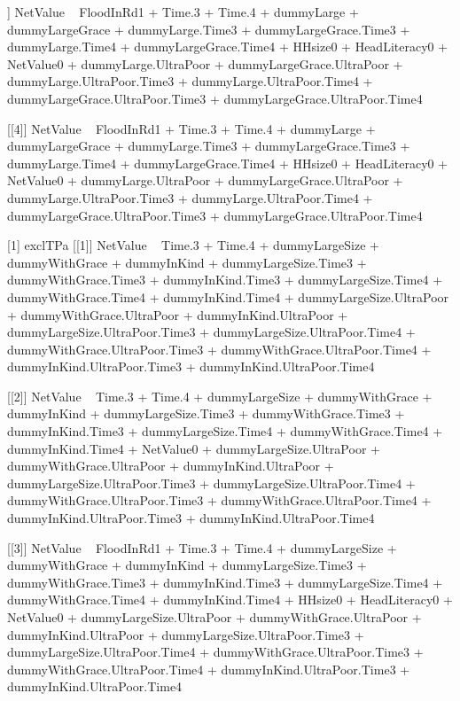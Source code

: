 \begin{Schunk}
\begin{Soutput}
[[3]]
NetValue ~ FloodInRd1 + Time.3 + Time.4 + dummyLarge + dummyLargeGrace + 
    dummyLarge.Time3 + dummyLargeGrace.Time3 + dummyLarge.Time4 + 
    dummyLargeGrace.Time4 + HHsize0 + HeadLiteracy0 + NetValue0 + 
    dummyLarge.UltraPoor + dummyLargeGrace.UltraPoor + dummyLarge.UltraPoor.Time3 + 
    dummyLarge.UltraPoor.Time4 + dummyLargeGrace.UltraPoor.Time3 + 
    dummyLargeGrace.UltraPoor.Time4

[[4]]
NetValue ~ FloodInRd1 + Time.3 + Time.4 + dummyLarge + dummyLargeGrace + 
    dummyLarge.Time3 + dummyLargeGrace.Time3 + dummyLarge.Time4 + 
    dummyLargeGrace.Time4 + HHsize0 + HeadLiteracy0 + NetValue0 + 
    dummyLarge.UltraPoor + dummyLargeGrace.UltraPoor + dummyLarge.UltraPoor.Time3 + 
    dummyLarge.UltraPoor.Time4 + dummyLargeGrace.UltraPoor.Time3 + 
    dummyLargeGrace.UltraPoor.Time4

[1] exclTPa
[[1]]
NetValue ~ Time.3 + Time.4 + dummyLargeSize + dummyWithGrace + 
    dummyInKind + dummyLargeSize.Time3 + dummyWithGrace.Time3 + 
    dummyInKind.Time3 + dummyLargeSize.Time4 + dummyWithGrace.Time4 + 
    dummyInKind.Time4 + dummyLargeSize.UltraPoor + dummyWithGrace.UltraPoor + 
    dummyInKind.UltraPoor + dummyLargeSize.UltraPoor.Time3 + 
    dummyLargeSize.UltraPoor.Time4 + dummyWithGrace.UltraPoor.Time3 + 
    dummyWithGrace.UltraPoor.Time4 + dummyInKind.UltraPoor.Time3 + 
    dummyInKind.UltraPoor.Time4

[[2]]
NetValue ~ Time.3 + Time.4 + dummyLargeSize + dummyWithGrace + 
    dummyInKind + dummyLargeSize.Time3 + dummyWithGrace.Time3 + 
    dummyInKind.Time3 + dummyLargeSize.Time4 + dummyWithGrace.Time4 + 
    dummyInKind.Time4 + NetValue0 + dummyLargeSize.UltraPoor + 
    dummyWithGrace.UltraPoor + dummyInKind.UltraPoor + dummyLargeSize.UltraPoor.Time3 + 
    dummyLargeSize.UltraPoor.Time4 + dummyWithGrace.UltraPoor.Time3 + 
    dummyWithGrace.UltraPoor.Time4 + dummyInKind.UltraPoor.Time3 + 
    dummyInKind.UltraPoor.Time4

[[3]]
NetValue ~ FloodInRd1 + Time.3 + Time.4 + dummyLargeSize + dummyWithGrace + 
    dummyInKind + dummyLargeSize.Time3 + dummyWithGrace.Time3 + 
    dummyInKind.Time3 + dummyLargeSize.Time4 + dummyWithGrace.Time4 + 
    dummyInKind.Time4 + HHsize0 + HeadLiteracy0 + NetValue0 + 
    dummyLargeSize.UltraPoor + dummyWithGrace.UltraPoor + dummyInKind.UltraPoor + 
    dummyLargeSize.UltraPoor.Time3 + dummyLargeSize.UltraPoor.Time4 + 
    dummyWithGrace.UltraPoor.Time3 + dummyWithGrace.UltraPoor.Time4 + 
    dummyInKind.UltraPoor.Time3 + dummyInKind.UltraPoor.Time4


\end{Soutput}
\end{Schunk}
